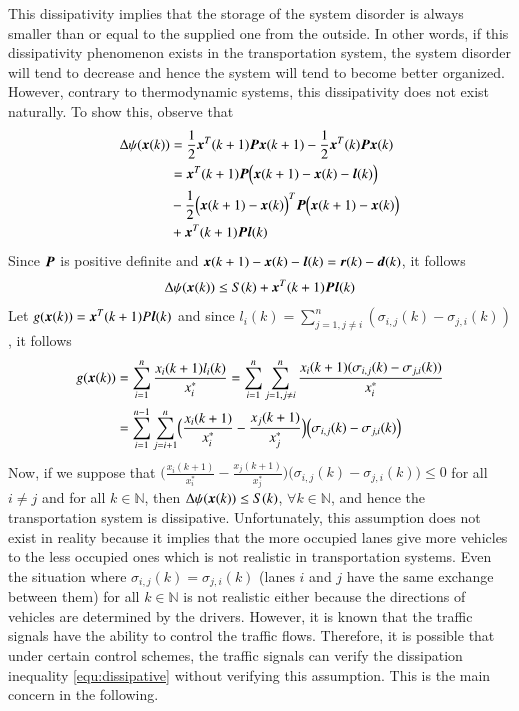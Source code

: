 \documentclass[preprint,authoryear,12pt]{elsarticle}
\renewcommand{\vec}[1]{\mbox{\boldmath$#1$}}
\newcommand{\mat}[1]{\mbox{\boldmath$#1$}}
\begin{document}
This dissipativity implies that the storage of the system disorder is
always smaller than or equal to the supplied one from the outside. In
other words, if this dissipativity phenomenon exists in the
transportation system, the system disorder will tend to decrease and
hence the system will tend to become better organized. 
However, contrary to thermodynamic systems, this dissipativity does not exist naturally. To show this, 
observe that 
\begin{align*}
\Delta\psi(\vec{x}(k))
&=\frac{1}{2}\vec{x}^T(k+1)\mat{P}\vec{x}(k+1)
-\frac{1}{2}\vec{x}^T(k)\mat{P}\vec{x}(k)\\
&=\vec{x}^T(k+1)\mat{P}
\Bigl(\vec{x}(k+1)-\vec{x}(k)-\vec{l}(k)\Bigr)\\
&-\frac{1}{2}\Bigl(\vec{x}(k+1)-\vec{x}(k)\Bigr)^T
\mat{P}\Bigl(\vec{x}(k+1)-\vec{x}(k)\Bigr)\\
&+\vec{x}^T(k+1)\mat{P}\vec{l}(k)\\
\end{align*}
Since $\mat{P}$ is positive definite and
$\vec{x}(k+1)-\vec{x}(k)-\vec{l}(k)=\vec{r}(k)-\vec{d}(k)$, it follows
\begin{equation}\label{equ:dissipative1}
\Delta\psi(\vec{x}(k))\leq S(k)+\vec{x}^T(k+1)\mat{P}\vec{l}(k)
\end{equation}
Let $g(\vec{x}(k))=\vec{x}^T(k+1)P\vec{l}(k)$ and since
$l_i(k)=\sum_{j=1,j\neq i}^{n}(\sigma_{i,j}(k)-\sigma_{j,i}(k))$, it
follows
\begin{align}\label{eq:g}
g(\vec{x}(k))&=\sum_{i=1}^{n}
\frac{x_i(k+1)l_i(k)}{x_i^*}=
\sum_{i=1}^{n}\sum_{j=1,j\neq i}^{n}
\frac{x_i(k+1)(\sigma_{i,j}(k)-\sigma_{j,i}(k))}{x_i^*}
\nonumber\\
&=\sum_{i=1}^{n-1}\sum_{j=i+1}^{n}
\Bigl(\frac{x_i(k+1)}{x_i^*}-\frac{x_j(k+1)}{x_j^*}\Bigr)
\Bigl(\sigma_{i,j}(k)-\sigma_{j,i}(k)\Bigl)\nonumber\\
 \end{align}
Now, if we suppose that
$\bigl(\frac{x_i(k+1)}{x_i^*}-\frac{x_j(k+1)}{x_j^*}\bigr)
\bigl(\sigma_{i,j}(k)-\sigma_{j,i}(k)\bigl)\le 0$ for all $i\neq j$
and for all $k\in\mathbb{N}$,
then $\Delta\psi(\vec{x}(k)) \leq S(k)$, $\forall k\in\mathbb{N}$, and
hence the transportation system is dissipative. Unfortunately, this 
assumption does not exist in reality because it implies that the more
occupied lanes give  more vehicles to the less occupied ones which is
not realistic in transportation systems. Even the situation where
$\sigma_{i,j}(k)=\sigma_{j,i}(k)$ (lanes $i$ and $j$ have the same  
exchange between them) for all $k\in\mathbb{N}$ is not realistic
either because the directions of vehicles are determined by the
drivers. However, it is known that the traffic signals have the
ability to control the traffic flows.
Therefore, it is possible that under certain control schemes, the
traffic signals can verify the dissipation inequality
\eqref{equ:dissipative} without verifying this assumption. This is the
main concern in the following.
\end{document}
